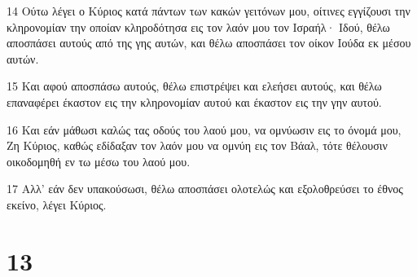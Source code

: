 \par 14 Ούτω λέγει ο Κύριος κατά πάντων των κακών γειτόνων μου, οίτινες εγγίζουσι την κληρονομίαν την οποίαν κληροδότησα εις τον λαόν μου τον Ισραήλ· Ιδού, θέλω αποσπάσει αυτούς από της γης αυτών, και θέλω αποσπάσει τον οίκον Ιούδα εκ μέσου αυτών.
\par 15 Και αφού αποσπάσω αυτούς, θέλω επιστρέψει και ελεήσει αυτούς, και θέλω επαναφέρει έκαστον εις την κληρονομίαν αυτού και έκαστον εις την γην αυτού.
\par 16 Και εάν μάθωσι καλώς τας οδούς του λαού μου, να ομνύωσιν εις το όνομά μου, Ζη Κύριος, καθώς εδίδαξαν τον λαόν μου να ομνύη εις τον Βάαλ, τότε θέλουσιν οικοδομηθή εν τω μέσω του λαού μου.
\par 17 Αλλ' εάν δεν υπακούσωσι, θέλω αποσπάσει ολοτελώς και εξολοθρεύσει το έθνος εκείνο, λέγει Κύριος.

\chapter{13}

